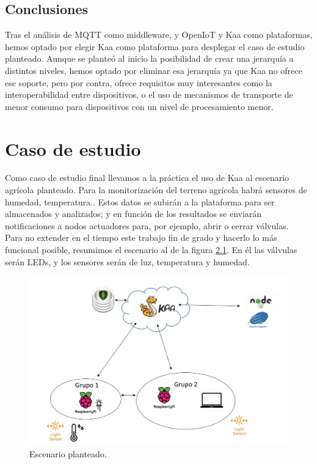 \documentclass[12pt, twoside]{book}
\begin{document}
\section{Conclusiones}
Tras el análisis de MQTT como middleware, y OpenIoT y Kaa como plataformas, hemos optado por elegir Kaa como plataforma para desplegar el caso de estudio planteado. Aunque se planteó al inicio la posibilidad de crear una jerarquía a distintos niveles, hemos optado por eliminar esa jerarquía ya que Kaa no ofrece ese soporte, pero por contra, ofrece requisitos muy interesantes como la interoperabilidad entre dispositivos, o el uso de mecanismos de transporte de menor consumo para dispositivos con un nivel de procesamiento menor. \\ 
\chapter{Caso de estudio}
Como caso de estudio final llevamos a la práctica el uso de Kaa al escenario agrícola planteado. Para la monitorización del terreno agrícola habrá sensores de humedad, temperatura.. Estos datos se subirán a la plataforma para ser almacenados y analizados; y en función de los resultados se enviarán notificaciones a nodos actuadores para, por ejemplo, abrir o cerrar válvulas. \\
Para no extender en el tiempo este trabajo fin de grado y hacerlo lo más funcional posible, resumimos el escenario al de la figura \ref{finalProject}. En él las válvulas serán LEDs, y los sensores serán de luz, temperatura y humedad. \\
\begin{figure}[H]
\centering
\includegraphics[scale=0.5]{images/finalProject}
\caption{Escenario planteado.}\label{finalProject}
\end{figure}
\end{document}
